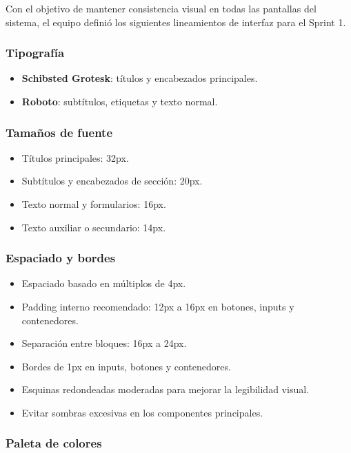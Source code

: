 \documentclass[12pt,a4paper]{article}
\begin{document}
Con el objetivo de mantener consistencia visual en todas las pantallas del sistema, el equipo definió los siguientes lineamientos de interfaz para el Sprint 1.

\subsubsection*{Tipografía}

\begin{itemize}
    \item \textbf{Schibsted Grotesk}: títulos y encabezados principales.
    \item \textbf{Roboto}: subtítulos, etiquetas y texto normal.
\end{itemize}

\subsubsection*{Tamaños de fuente}

\begin{itemize}
    \item Títulos principales: 32px.
    \item Subtítulos y encabezados de sección: 20px.
    \item Texto normal y formularios: 16px.
    \item Texto auxiliar o secundario: 14px.
\end{itemize}

\subsubsection*{Espaciado y bordes}

\begin{itemize}
    \item Espaciado basado en múltiplos de 4px.
    \item Padding interno recomendado: 12px a 16px en botones, inputs y contenedores.
    \item Separación entre bloques: 16px a 24px.
    \item Bordes de 1px en inputs, botones y contenedores.
    \item Esquinas redondeadas moderadas para mejorar la legibilidad visual.
    \item Evitar sombras excesivas en los componentes principales.
\end{itemize}

\subsubsection*{Paleta de colores}
\end{document}
